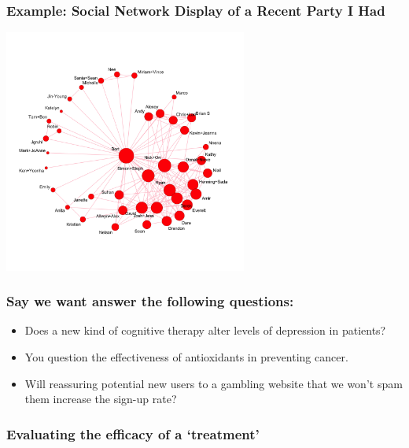 \documentclass[handout]{beamer}
\newcommand{\blue}[1]{\textcolor{blue2}{#1}}
\begin{document}
\begin{frame}[fragile]
\frametitle{Example: Social Network Display of a Recent Party I Had}
\begin{center}
\includegraphics[width=8cm]{figure/network.png}
\end{center}
\end{frame}


\begin{frame}
\frametitle{Say we want answer the following questions:}
\begin{itemize}
\item Does a new kind of cognitive therapy alter levels of depression in patients?
\pause\item You question the effectiveness of antioxidants in preventing cancer.
\pause\item Will reassuring potential new users to a gambling website that we won't spam them increase the sign-up rate?
\end{itemize}

\end{frame}



\begin{frame}
\frametitle{Evaluating the efficacy of a `treatment'}

%
%

\end{frame}
\end{document}
